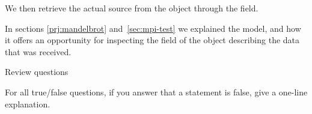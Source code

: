 We then retrieve the
actual source from the  object through the
 field.
%
%

In sections \ref{prj:mandelbrot} and~\ref{sec:mpi-test} we explained
the  model, and how it offers an opportunity for inspecting the
 field of the 
object describing the data that was received.


 {Review questions}

For all true/false questions, if you answer that a statement is false,
give a one-line explanation.

